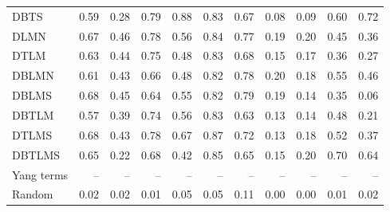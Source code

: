 \begin{longtable}{@{}lrrrrrrrrrr@{}}
DBTS & 0.59 & 0.28 & 0.79 & 0.88 & 0.83 & 0.67 & 0.08 & 0.09 & 0.60 & 0.72 \\
DLMN & 0.67 & 0.46 & 0.78 & 0.56 & 0.84 & 0.77 & 0.19 & 0.20 & 0.45 & 0.36 \\
DTLM & 0.63 & 0.44 & 0.75 & 0.48 & 0.83 & 0.68 & 0.15 & 0.17 & 0.36 & 0.27 \\
DBLMN & 0.61 & 0.43 & 0.66 & 0.48 & 0.82 & 0.78 & 0.20 & 0.18 & 0.55 & 0.46 \\
DBLMS & 0.68 & 0.45 & 0.64 & 0.55 & 0.82 & 0.79 & 0.19 & 0.14 & 0.35 & 0.06 \\
DBTLM & 0.57 & 0.39 & 0.74 & 0.56 & 0.83 & 0.63 & 0.13 & 0.14 & 0.48 & 0.21 \\
DTLMS & 0.68 & 0.43 & 0.78 & 0.67 & 0.87 & 0.72 & 0.13 & 0.18 & 0.52 & 0.37 \\
DBTLMS & 0.65 & 0.22 & 0.68 & 0.42 & 0.85 & 0.65 & 0.15 & 0.20 & 0.70 & 0.64 \\
Yang terms & -- & -- & -- & -- & -- & -- & -- & -- & -- & -- \\
Random & 0.02 & 0.02 & 0.01 & 0.05 & 0.05 & 0.11 & 0.00 & 0.00 & 0.01 & 0.02 \\
\end{longtable}
